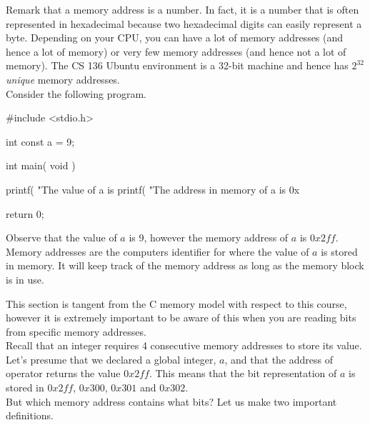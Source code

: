 Remark that a memory address is a number. In fact, it is a number that is often represented in hexadecimal because two hexadecimal digits can easily represent a byte. Depending on your CPU, you can have a lot of memory addresses (and hence a lot of memory) or very few memory addresses (and hence not a lot of memory). The CS 136 Ubuntu environment is a 32-bit machine and hence has $2^{32}$ \emph{unique} memory addresses.\\

Consider the following program.\\


\begin{code}[c]
#include <stdio.h>

int const a = 9;

int main( void ) {
	printf( "The value of a is %
	printf( "The address in memory of a is 0x%
	
	return 0;
}
\end{code}

Observe that the value of $a$ is 9, however the memory address of $a$ is $0x2ff$. Memory addresses are the computers identifier for where the value of $a$ is stored in memory. It will keep track of the memory address as long as the memory block is in use.\\



This section is tangent from the C memory model with respect to this course, however it is extremely important to be aware of this when you are reading bits from specific memory addresses.\\

Recall that an integer requires 4 consecutive memory addresses to store its value. Let's presume that we declared a global integer, $a$, and that the address of operator returns the value $0x2ff$. This means that the bit representation of $a$ is stored in $0x2ff$, $0x300$, $0x301$ and $0x302$.\\

But which memory address contains what bits? Let us make two important definitions.\\


